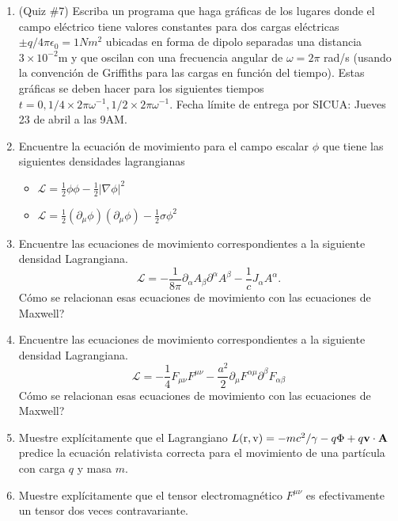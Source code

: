 \documentclass[letterpaper,10pt,onecolumn]{article}
\begin{document}
\begin{enumerate}
\item (Quiz \#7) Escriba un programa que haga gr\'aficas de los lugares
  donde el campo el\'ectrico tiene valores constantes para dos cargas 
  el\'ectricas $\pm q/4\pi\epsilon_0=1N m^2$ ubicadas en forma de
  dipolo separadas una distancia $3\times 10^{-2}$m y que oscilan con
  una frecuencia angular de $\omega = 2\pi$ rad/s (usando la
  convenci\'on de Griffiths para las cargas en funci\'on del
  tiempo). Estas gr\'aficas se deben hacer 
  para los siguientes tiempos $t=0, 1/4\times 2\pi\omega^{-1},
  1/2\times 2\pi\omega^{-1}$.  Fecha l\'imite de entrega por SICUA:
  Jueves 23 de abril a las 9AM. 

\item Encuentre la ecuaci\'on de movimiento para el campo escalar
  $\phi$ que tiene las siguientes densidades lagrangianas
\begin{itemize}
\item ${\mathcal L} = \frac{1}{2}\phi\phi - \frac{1}{2}|\nabla\phi|^2$
\item ${\mathcal L} = \frac{1}{2}(\partial_\mu\phi)(\partial_\mu\phi) -
  \frac{1}{2}\sigma\phi^2 $
\end{itemize}


\item Encuentre las ecuaciones de movimiento correspondientes a la
  siguiente densidad Lagrangiana.
\begin{equation}
{\mathcal L} = -\frac{1}{8\pi}\partial_\alpha A_\beta
\partial^{\alpha}A^{\beta} -\frac{1}{c}J_{\alpha}A^{\alpha}.
\end{equation}
C\'omo se relacionan esas ecuaciones de movimiento con las ecuaciones
de Maxwell?

\item Encuentre las ecuaciones de movimiento correspondientes a la
  siguiente densidad Lagrangiana.
\begin{equation}
{\mathcal L} = -\frac{1}{4}F_{\mu\nu}F^{\mu\nu} -
\frac{a^2}{2}\partial_\mu F^{\alpha\mu}\partial^{\beta}F_{\alpha\beta}
\end{equation}
C\'omo se relacionan esas ecuaciones de movimiento con las ecuaciones
de Maxwell?

\item Muestre expl\'icitamente que el Lagrangiano $L({\rm r, {\rm
    v}})=-mc^2/\gamma - q\Phi + q{\bf v}\cdot{\bf A}$ predice la
  ecuaci\'on relativista correcta para el movimiento de una
  part\'icula con carga $q$ y masa $m$.

\item Muestre expl\'icitamente que el tensor electromagn\'etico
  $F^{\mu\nu}$ es efectivamente un tensor dos veces contravariante.

\end{enumerate}
\end{document}
